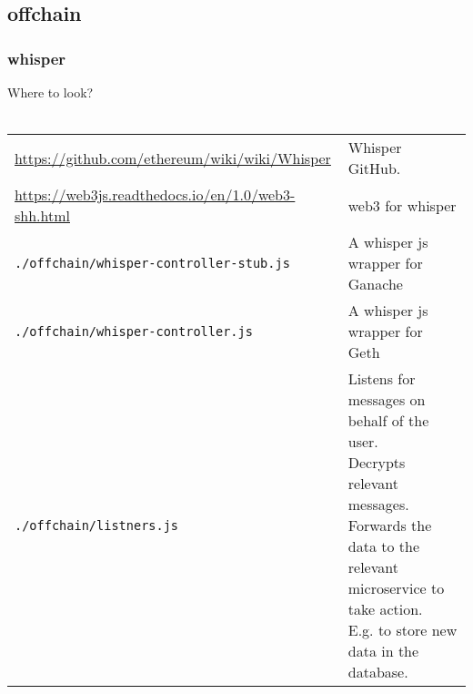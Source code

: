 \subsection{offchain}
\label{sec:offchain}

\subsubsection{whisper}
\label{sec:whisper}

\begin{center}
  \begin{mdframed}[backgroundcolor=verylightblue]
    Where to look?\\
    \\
    \begin{tabular}{lp{14cm}}
      \url{https://github.com/ethereum/wiki/wiki/Whisper} & Whisper GitHub.\\
      \url{https://web3js.readthedocs.io/en/1.0/web3-shh.html} & web3 for whisper\\
      \texttt{./offchain/whisper-controller-stub.js} & A whisper js wrapper for Ganache\\
      \texttt{./offchain/whisper-controller.js} & A whisper js wrapper for Geth\\
      \texttt{./offchain/listners.js} & \makecell[lt]{Listens for messages on behalf of the user.\\
      Decrypts relevant messages.\\
      Forwards the data to the relevant microservice to\\
      take action.\\
      E.g. to store new data in the database.}\\
    \end{tabular}
  \end{mdframed}
\end{center}

